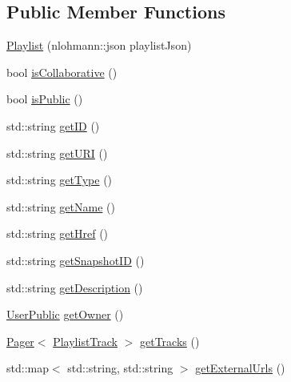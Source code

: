 \subsection*{Public Member Functions}
\begin{DoxyCompactItemize}
\item 
\mbox{\hyperlink{class_playlist_a400993e8e6892a6ad3631dfaacf63d49}{Playlist}} (nlohmann\+::json playlist\+Json)
\item 
bool \mbox{\hyperlink{class_playlist_a49effd021d8ac190376d7e0c75a37699}{is\+Collaborative}} ()
\item 
bool \mbox{\hyperlink{class_playlist_a088b240198be8e420f364acceeb14472}{is\+Public}} ()
\item 
std\+::string \mbox{\hyperlink{class_playlist_afae241b1fda9875ae8da118ac7ef9c73}{get\+ID}} ()
\item 
std\+::string \mbox{\hyperlink{class_playlist_a3bb9e2e9ec7234053842a504dcf4b1e5}{get\+U\+RI}} ()
\item 
std\+::string \mbox{\hyperlink{class_playlist_a3704ccb176d9c3fb820f75328958f4b0}{get\+Type}} ()
\item 
std\+::string \mbox{\hyperlink{class_playlist_a569ad905cc657c46f25b210a21186b2f}{get\+Name}} ()
\item 
std\+::string \mbox{\hyperlink{class_playlist_a666019c1bbb7850383024bd6c0951b70}{get\+Href}} ()
\item 
std\+::string \mbox{\hyperlink{class_playlist_a14852f4a0b9af8e75a4833dc2e723a55}{get\+Snapshot\+ID}} ()
\item 
std\+::string \mbox{\hyperlink{class_playlist_ab7e32c20228475b77010332718af56a8}{get\+Description}} ()
\item 
\mbox{\hyperlink{class_user_public}{User\+Public}} \mbox{\hyperlink{class_playlist_aa7ddfe2017eea09bba019a3754818d7e}{get\+Owner}} ()
\item 
\mbox{\hyperlink{class_pager}{Pager}}$<$ \mbox{\hyperlink{class_playlist_track}{Playlist\+Track}} $>$ \mbox{\hyperlink{class_playlist_a326bbf1003a1473fba8d54dbf48f4eb1}{get\+Tracks}} ()
\item 
std\+::map$<$ std\+::string, std\+::string $>$ \mbox{\hyperlink{class_playlist_aed089de43cb58f23f600a47f98dcaaff}{get\+External\+Urls}} ()
\end{DoxyCompactItemize}
